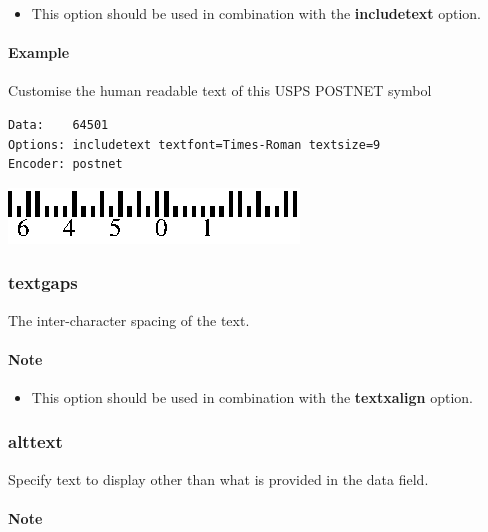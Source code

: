 \begin{itemize}
\tightlist
\item
  This option should be used in combination with the
  \textbf{includetext} option.
\end{itemize}

\hypertarget{example-34}{%
\paragraph{Example}\label{example-34}}

Customise the human readable text of this USPS POSTNET symbol

\begin{verbatim}
Data:    64501
Options: includetext textfont=Times-Roman textsize=9
Encoder: postnet
\end{verbatim}

\includegraphics{images/opttextfont.eps}

\hypertarget{textgaps}{%
\subsubsection{textgaps}\label{textgaps}}

The inter-character spacing of the text.

\hypertarget{note-1}{%
\paragraph{Note}\label{note-1}}

\begin{itemize}
\tightlist
\item
  This option should be used in combination with the \textbf{textxalign}
  option.
\end{itemize}

\hypertarget{alttext}{%
\subsubsection{alttext}\label{alttext}}

Specify text to display other than what is provided in the data field.

\hypertarget{note-2}{%
\paragraph{Note}\label{note-2}}

